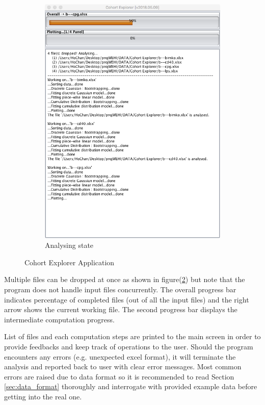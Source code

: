 \documentclass{article}
\begin{document}
\begin{figure}[ht]
\begin{subfigure}[ht]{0.4\linewidth}
        \includegraphics[scale=0.3]{./img/MainWindow-2_1.png}
        \centering
        \caption{Analysing state}
        \label{fig1b:analysing}
    \end{subfigure}
    \caption{Cohort Explorer Application}
\end{figure}
Multiple files can be dropped at once as shown in figure(\ref{fig1b:analysing}) but note that the program does not handle input files concurrently. The overall progress bar indicates percentage of completed files (out of all the input files) and the right arrow shows the current working file. The second progress bar displays the intermediate computation progress.

List of files and each computation steps are printed to the main screen in order to provide feedbacks and keep track of operations to the user. Should the program encounters any errors (e.g. unexpected excel format), it will terminate the analysis and reported back to user with clear error messages. Most common errors are raised due to data format so it is recommended to read Section \ref{sec:data_format} thoroughly and interrogate with provided example data before getting into the real one.
\end{document}
